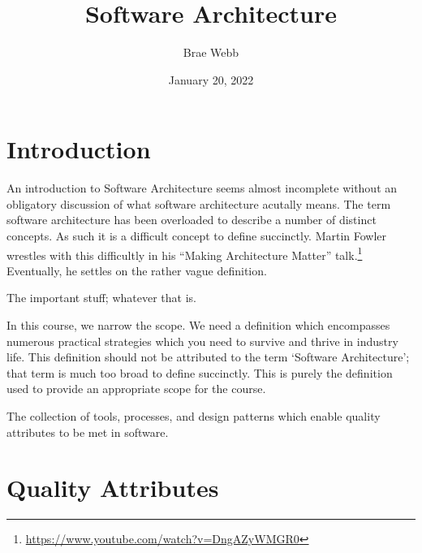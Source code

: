 \documentclass{csse4400}
\title{Software Architecture}
\author{Brae Webb}
\date{January 20, 2022}
\begin{document}
\makecover

\maketitle

\section{Introduction}
An introduction to Software Architecture seems almost incomplete without an obligatory
discussion of what software architecture acutally means.
The term software architecture has been overloaded to describe a number of distinct concepts.
As such it is a difficult concept to define succinctly.
Martin Fowler wrestles with this difficultly in his ``Making Architecture Matter'' talk.\footnote{\url{https://www.youtube.com/watch?v=DngAZyWMGR0}}
Eventually, he settles on the rather vague definition.

\begin{definition}
The important stuff; whatever that is.
\end{definition}

In this course, we narrow the scope.
We need a definition which encompasses numerous practical strategies which you need to survive and thrive in industry life.
This definition should not be attributed to the term `Software Architecture'; that term is much too broad to define succinctly.
This is purely the definition used to provide an appropriate scope for the course.

\begin{definition}
The collection of tools, processes, and design patterns which enable quality attributes to be met in software.
\end{definition}

\section{Quality Attributes}
\end{document}

